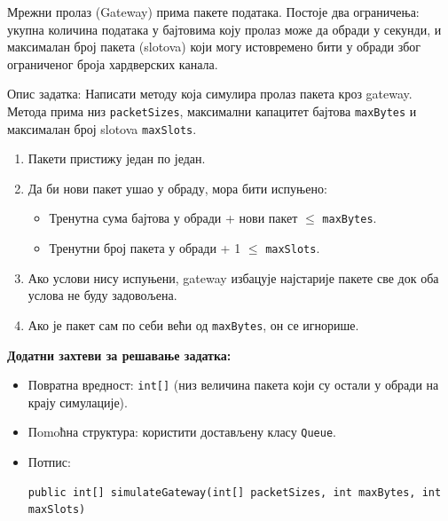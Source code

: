 Мрежни пролаз (Gateway) прима пакете података. Постоје два ограничења: укупна количина података у бајтовима коју пролаз може да обради у секунди, и максималан број пакета (slotova) који могу истовремено бити у обради због ограниченог броја хардверских канала.

Опис задатка: Написати методу која симулира пролаз пакета кроз gateway. Метода прима низ \texttt{packetSizes}, максимални капацитет бајтова \texttt{maxBytes} и максималан број slotova \texttt{maxSlots}.

\begin{enumerate}
	\item Пакети пристижу један по један.
	\item Да би нови пакет ушао у обраду, мора бити испуњено:
	\begin{itemize}
		\item Тренутна сума бајтова у обради + нови пакет $\leq$ \texttt{maxBytes}.
		\item Тренутни број пакета у обради + 1 $\leq$ \texttt{maxSlots}.
	\end{itemize}
	\item Ако услови нису испуњени, gateway избацује најстарије пакете све док оба услова не буду задовољена.
	\item Ако је пакет сам по себи већи од \texttt{maxBytes}, он се игнорише.
\end{enumerate}

\textbf{Додатни захтеви за решавање задатка:}
\begin{itemize}
	\item Повратна вредност: \texttt{int[]} (низ величина пакета који су остали у обради на крају симулације).
	\item Пomoћна структура: користити достављену класу \texttt{Queue}.
	\item Потпис:
	\begin{Verbatim}[fontsize=\small]
public int[] simulateGateway(int[] packetSizes, int maxBytes, int maxSlots)
	\end{Verbatim}
\end{itemize}

